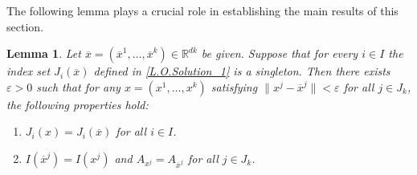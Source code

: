 \documentclass[sn-mathphys-num]{sn-jnl}%
\newtheorem{lemma}[theorem]{Lemma}
\theoremstyle{definition}
\begin{document}
The following lemma plays a crucial role in establishing the main results of this section.

\begin{lemma}
	\label{L.O.Solution_2}
	Let $\overline{x}=(\overline{x}^1,\dots,\overline{x}^k)\in \mathbb{R}^{dk}$ be given. Suppose that for every $i\in I$ the index set $J_i(\overline{x})$ defined in \eqref{L.O.Solution_1} is a singleton. Then there exists $\varepsilon>0$ such that for any 
	$x=(x^1,\dots,x^k)$ satisfying $\|x^j-\overline{x}^j\|<\varepsilon$ for all $j \in J_k$, \color{black}the following properties hold:
	\begin{enumerate}
		\item [\rm {(a)}] $J_i(x)=J_i(\overline{x})$ for all $i \in I$.
		\item [\rm {(b)}] $I(\overline{x}^j)=I(x^j)$ and $A_{x^j}=A_{\overline{x}^j}$ for all $j \in J_k$.
	\end{enumerate}
\end{lemma}
\end{document}
